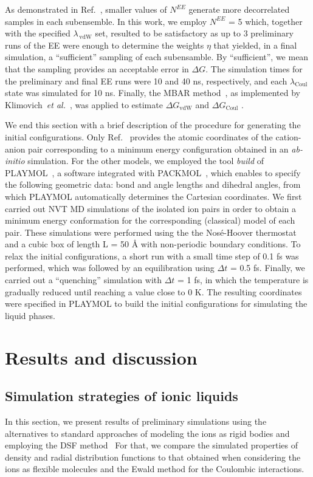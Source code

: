 \documentclass[3p,twocolumn]{elsarticle}
\begin{document}
As demonstrated in Ref.~, smaller values of $N^{EE}$ generate more decorrelated samples in each subensemble. In this work, we employ $N^{EE}$ = 5 which, together with the specified $\lambda_{\, \text{vdW}}$ set, resulted to be satisfactory as up to 3 preliminary runs of the EE were enough to determine the weights $\eta$ that yielded, in a final simulation, a ``sufficient'' sampling of each subensamble. By ``sufficient'', we mean that the sampling provides an acceptable error in $\Delta G$. The simulation times for the preliminary and final EE runs were 10 and 40 ns, respectively, and each $\lambda_{\text{Coul}}$ state was simulated for 10 ns. Finally, the MBAR method~\cite{Shirts_2008}, as implemented by Klimovich~\textit{et al.}~\cite{Klimovich_2015}, was applied to estimate $\Delta G_{\text{vdW}}$ and $\Delta G_{\text{Coul}}$ .

We end this section with a brief description of the procedure for generating the initial configurations. Only Ref.~ provides the atomic coordinates of the cation-anion pair corresponding to a minimum energy configuration obtained in an \textit{ab-initio} simulation. For the other models, we employed the tool \textit{build} of PLAYMOL~\cite{playmol}, a software integrated with PACKMOL~\cite{Mart_nez_2009}, which enables to specify the following geometric data: bond and angle lengths and dihedral angles, from which PLAYMOL automatically determines the Cartesian coordinates. We first carried out NVT MD simulations of the isolated ion pairs in order to obtain a minimum energy conformation for the corresponding (classical) model of each pair. These simulations were performed using the the Nos\'{e}-Hoover thermostat~\cite{Martyna1992} and a cubic box of length L = 50 {\AA} with non-periodic boundary conditions. To relax the initial configurations, a short run with a small time step of 0.1 fs was performed, which was followed by an equilibration using $\Delta t$ = 0.5 fs. Finally, we carried out a ``quenching'' simulation with $\Delta t$ = 1 fs, in which the temperature is gradually reduced until reaching a value close to 0 K. The resulting coordinates were specified in PLAYMOL to build the initial configurations for simulating the liquid phases.

\section{Results and discussion}
\label{sec:results}

\subsection{Simulation strategies of ionic liquids}
\label{sec:prel_results}
In this section, we present results of preliminary simulations using the  alternatives to standard approaches of modeling the ions as rigid bodies and employing the DSF method~\cite{Fennell2006} For that, we compare the simulated properties of density and radial distribution functions to that obtained when considering the ions as flexible molecules and the Ewald method for the Coulombic interactions.
\end{document}
